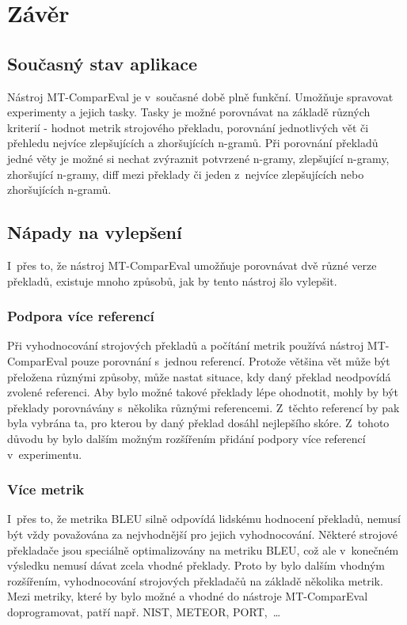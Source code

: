 \chapter{Závěr}

\section{Současný stav aplikace}
Nástroj MT-ComparEval je v~současné době plně funkční.
Umožňuje spravovat experimenty a jejich tasky.
Tasky je možné porovnávat na základě různých kriterií -
  hodnot metrik strojového překladu,
  porovnání jednotlivých vět
  či přehledu nejvíce zlepšujících a zhoršujících \mbox{n-gramů}.
Při porovnání překladů jedné věty je možné si nechat zvýraznit
  potvrzené \mbox{n-gramy}, zlepšující \mbox{n-gramy}, zhoršující \mbox{n-gramy}, diff mezi překlady
  či jeden z~nejvíce zlepšujících nebo zhoršujících \mbox{n-gramů}.


\section{Nápady na vylepšení}
I~přes to, že nástroj MT-ComparEval umožňuje porovnávat dvě různé verze překladů,
  existuje mnoho způsobů,
  jak by tento nástroj šlo vylepšit.

\subsection{Podpora více referencí}
Při vyhodnocování strojových překladů a počítání metrik používá nástroj MT-ComparEval pouze porovnání s~jednou referencí.
Protože většina vět může být přeložena různými způsoby,
  může nastat situace,
  kdy daný překlad neodpovídá zvolené referenci.
Aby bylo možné takové překlady lépe ohodnotit,
  mohly by být překlady porovnávány s~několika různými referencemi.
Z~těchto referencí by pak byla vybrána ta,
  pro kterou by daný překlad dosáhl nejlepšího skóre.
Z~tohoto důvodu by bylo dalším možným rozšířením přidání podpory více referencí v~experimentu.

\subsection{Více metrik}
I~přes to, že metrika BLEU silně odpovídá lidskému hodnocení překladů,
  nemusí být vždy považována za nejvhodnější pro jejich vyhodnocování.
Některé strojové překladače jsou speciálně optimalizovány na metriku BLEU,
  což ale v~konečném výsledku nemusí dávat zcela vhodné překlady.
Proto by bylo dalším vhodným rozšířením,
  vyhodnocování strojových překladačů na základě několika metrik.
Mezi metriky,
  které by bylo možné a vhodné do nástroje MT-ComparEval doprogramovat,
  patří např. NIST, METEOR, PORT,~\dots

